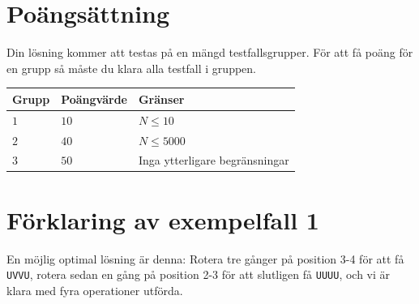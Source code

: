 \section*{Poängsättning}
Din lösning kommer att testas på en mängd testfallsgrupper.
För att få poäng för en grupp så måste du klara alla testfall i gruppen.

\noindent
\begin{tabular}{| l | l | l |}
  \hline
  Grupp & Poängvärde & Gränser \\ \hline
  $1$   & $10$       & $N \leq 10$ \\ \hline
  $2$   & $40$       & $N \leq 5000$ \\ \hline
  $3$   & $50$       & Inga ytterligare begränsningar \\ \hline
\end{tabular}

\section*{Förklaring av exempelfall 1}
En möjlig optimal lösning är denna: Rotera tre gånger på position 3-4 för att få \texttt{UVVU}, rotera sedan en gång på position 2-3 för att slutligen få \texttt{UUUU}, och vi är klara med fyra operationer utförda.
